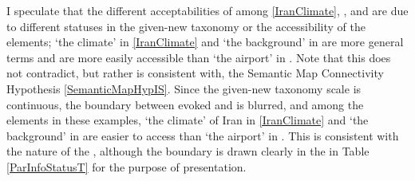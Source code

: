I speculate that the different acceptabilities of  among \ref{IranClimate}, \LLast, and \Last are due to different statuses in the given-new taxonomy or the accessibility of the elements;
`the climate' in \ref{IranClimate} and `the background' in \LLast are more general terms and are more easily accessible
than `the airport' in \Last.
Note that this does not contradict, but rather is consistent with, the Semantic Map Connectivity Hypothesis \ref{SemanticMapHypIS}.
Since the given-new taxonomy scale is continuous,
the boundary between evoked and  is blurred, and
among the  elements in these examples,
`the climate' of Iran in \ref{IranClimate} and `the background' in \LLast are easier to access than `the airport' in \Last.
This is consistent with the nature of the ,
although the boundary is drawn clearly in the  in Table \ref{ParInfoStatusT}
for the purpose of presentation.

